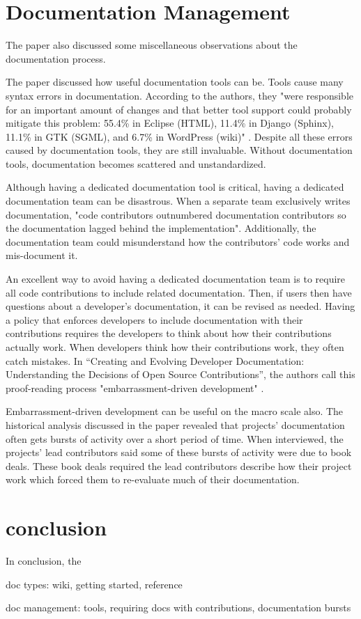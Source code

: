 \documentclass[titlepage]{article}
\begin{document}
\section{Documentation Management}

The paper also discussed some miscellaneous observations about the documentation process. 

The paper discussed how useful documentation tools can be. Tools cause many syntax errors in documentation. According to the authors, they "were responsible for an important amount of changes and that better tool support could probably mitigate this problem: 55.4\% in Eclipse (HTML), 11.4\% in Django (Sphinx), 11.1\% in GTK (SGML), and 6.7\% in WordPress (wiki)" \cite[p.4]{Dagenais:2010:CED:1882291.1882312}. Despite all these errors caused by documentation tools, they are still invaluable. Without documentation tools, documentation becomes scattered and unstandardized.

Although having a dedicated documentation tool is critical, having a dedicated documentation team can be disastrous. When a separate team exclusively writes documentation, "code contributors outnumbered documentation contributors so the documentation lagged behind the implementation"\cite[p.7]{Dagenais:2010:CED:1882291.1882312}. Additionally, the documentation team could misunderstand how the contributors' code works and mis-document it.


An excellent way to avoid having a dedicated documentation team is to require all code contributions to include related documentation. Then, if users then have questions about a developer's documentation, it can be revised as needed. Having a policy that enforces developers to include documentation with their contributions requires the developers to think about how their contributions actually work. When developers think how their contributions work, they often catch mistakes. In “Creating and Evolving Developer Documentation: Understanding the Decisions of Open Source Contributions”, the authors call this proof-reading process "embarrassment-driven development" \cite[p.6]{Dagenais:2010:CED:1882291.1882312}.

Embarrassment-driven development can be useful on the macro scale also. The historical analysis discussed in the paper revealed that projects' documentation often gets bursts of activity over a short period of time. When interviewed, the projects' lead contributors said some of these bursts of activity were due to book deals. These book deals required the lead contributors describe how their project work which forced them to re-evaluate much of their documentation.

\section{conclusion}

In conclusion, the 

doc types: wiki, getting started, reference

doc management: tools, requiring docs with contributions, documentation bursts



\end{document}
